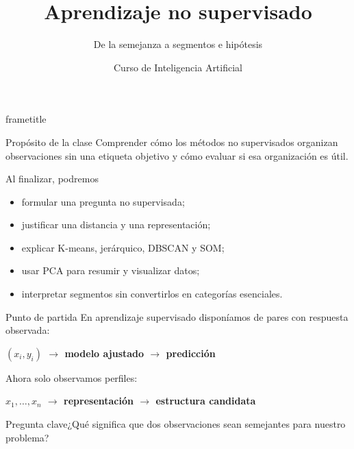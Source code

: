 \documentclass[aspectratio=169,10pt]{beamer}
\title[IA · Clase 8]{Aprendizaje no supervisado}
\subtitle{De la semejanza a segmentos e hipótesis}
\author{Curso de Inteligencia Artificial}
\institute{Semana 8 · Clase 8}
\date{}
\newcommand{\concepto}[1]{\textcolor{UAPTeal}{\textbf{#1}}}
\newcommand{\pregunta}[1]{\begin{block}{Pregunta clave}#1\end{block}}
\begin{document}
\begin{frame}[plain]
  \begin{beamercolorbox}[wd=\paperwidth,ht=\paperheight,sep=2em]{frametitle}
    \vfill
    {\Huge\bfseries\inserttitle\par}\vspace{.45em}
    {\color{UAPGold}\Large\insertsubtitle\par}\vspace{1.2em}
    \par
    \vfill {\color{UAPGold}\large\insertauthor\par}{\color{white}\insertinstitute\par}
  \end{beamercolorbox}
\end{frame}

\begin{frame}{Propósito de la clase}
  Comprender cómo los métodos no supervisados organizan observaciones sin una etiqueta objetivo y cómo evaluar si esa organización es útil.
  \begin{block}{Al finalizar, podremos}
    \begin{itemize}
      \item formular una pregunta no supervisada;
      \item justificar una distancia y una representación;
      \item explicar K-means, jerárquico, DBSCAN y SOM;
      \item usar PCA para resumir y visualizar datos;
      \item interpretar segmentos sin convertirlos en categorías esenciales.
    \end{itemize}
  \end{block}
\end{frame}

\begin{frame}{Punto de partida}
  \small
  En aprendizaje supervisado disponíamos de pares con respuesta observada:
  \begin{center}\concepto{$(x_i,y_i)$ $\rightarrow$ modelo ajustado $\rightarrow$ predicción}\end{center}
  Ahora solo observamos perfiles:
  \begin{center}\concepto{$x_1,\ldots,x_n$ $\rightarrow$ representación $\rightarrow$ estructura candidata}\end{center}
  \pregunta{¿Qué significa que dos observaciones sean semejantes para nuestro problema?}
\end{frame}
\end{document}
